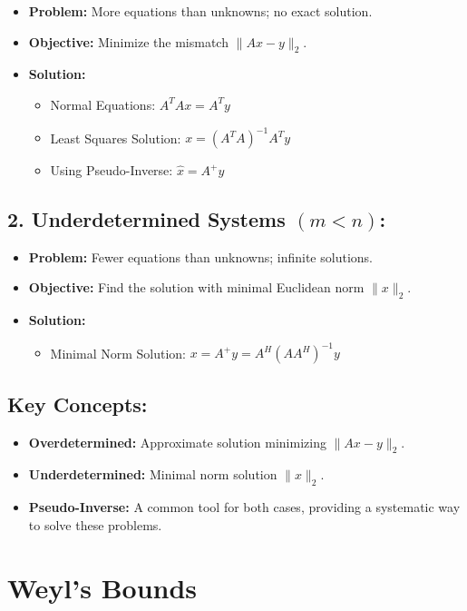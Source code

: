 \documentclass{article}
\begin{document}
\begin{itemize}
    \item \textbf{Problem:} More equations than unknowns; no exact solution.
    \item \textbf{Objective:} Minimize the mismatch $\|Ax - y\|_2$.
    \item \textbf{Solution:}
    \begin{itemize}
        \item Normal Equations: $A^TAx = A^Ty$
        \item Least Squares Solution: $x = (A^TA)^{-1}A^Ty$
        \item Using Pseudo-Inverse: $\hat{x} = A^+y$
    \end{itemize}
\end{itemize}

\subsection*{2. Underdetermined Systems $(m < n)$:}

\begin{itemize}
    \item \textbf{Problem:} Fewer equations than unknowns; infinite solutions.
    \item \textbf{Objective:} Find the solution with minimal Euclidean norm $\|x\|_2$.
    \item \textbf{Solution:}
    \begin{itemize}
        \item Minimal Norm Solution: $x = A^+y = A^H(AA^H)^{-1}y$
    \end{itemize}
\end{itemize}

\subsection*{Key Concepts:}

\begin{itemize}
    \item \textbf{Overdetermined:} Approximate solution minimizing $\|Ax - y\|_2$.
    \item \textbf{Underdetermined:} Minimal norm solution $\|x\|_2$.
    \item \textbf{Pseudo-Inverse:} A common tool for both cases, providing a systematic way to solve these problems.
\end{itemize}


\section{Weyl's Bounds}
\end{document}
